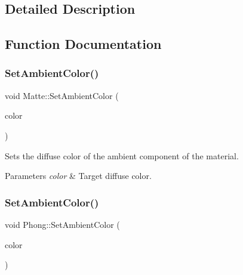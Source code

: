 \subsection{Detailed Description}


\subsection{Function Documentation}
\hypertarget{group___materials_ga3a3fb682a6cfb419d05bf5dba9088f57}{}\label{group___materials_ga3a3fb682a6cfb419d05bf5dba9088f57} 
\subsubsection{\texorpdfstring{Set\+Ambient\+Color()}{SetAmbientColor()}\hspace{0.1cm}{\footnotesize\ttfamily [1/2]}}
{\footnotesize\ttfamily void Matte\+::\+Set\+Ambient\+Color (\begin{DoxyParamCaption}\item[{const \hyperlink{class_r_g_b_color}{R\+G\+B\+Color} \&}]{color }\end{DoxyParamCaption})\hspace{0.3cm}{\ttfamily [inline]}}

Sets the diffuse color of the ambient component of the material. 
\begin{DoxyParams}{Parameters}
{\em color} & Target diffuse color. \\
\hline
\end{DoxyParams}
\hypertarget{group___materials_ga7562b2e0139a3e2e93e61954d13c281f}{}\label{group___materials_ga7562b2e0139a3e2e93e61954d13c281f} 
\subsubsection{\texorpdfstring{Set\+Ambient\+Color()}{SetAmbientColor()}\hspace{0.1cm}{\footnotesize\ttfamily [2/2]}}
{\footnotesize\ttfamily void Phong\+::\+Set\+Ambient\+Color (\begin{DoxyParamCaption}\item[{const \hyperlink{class_r_g_b_color}{R\+G\+B\+Color} \&}]{color }\end{DoxyParamCaption})\hspace{0.3cm}{\ttfamily [inline]}}

